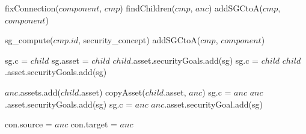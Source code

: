 \begin{algorithm}[H] 
\begin{algorithmic}

 \label{line:subcomponent}
 \label{line:connection}
\EndIf
\State fixConnection($component$, $cmp$)
\State findChildren($cmp$, $anc$)
\State addSGCtoA($cmp$, $component$)

\EndFor
\Else
{}
\State sg\_compute($cmp.id$, security\_concept)
\State addSGCtoA($cmp$, $component$)
\EndFor
\EndIf
\EndFunction

 \label{line:anc_child}  
\State sg.c = $child$
\State sg.asset = $child$
\State $child$.asset.securityGoals.add(sg)
\Else
\State sg.c = $child$
\State $child$.asset.securityGoals.add(sg)
\EndIf
\EndFor
\EndFor
\EndFunction

\end{algorithmic}
\end{algorithm}

\begin{algorithm}[H] 
\begin{algorithmic}

 \label{line:child_anc} 
\State $anc$.assets.add($child$.asset) \label{line:asset_add}
\State copyAsset($child$.asset, $anc$) \label{line:asset_copy}
\State sg.c = $anc$
\State $anc$.asset.securityGoals.add(sg)
\State sg.c = $anc$
\State $anc$.asset.securityGoal.add(sg)
\EndIf
\EndFor
\EndFor
\EndFunction

\State con.source = $anc$
\State con.target = $anc$
\EndIf
\EndFor
\EndFunction
{}

\end{algorithmic}
\end{algorithm}

